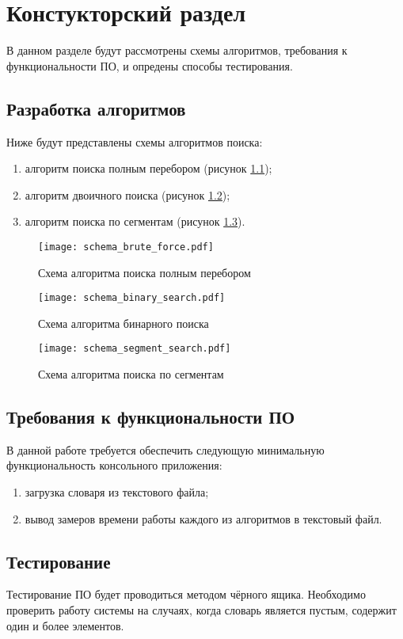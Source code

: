 \chapter{ Констукторский раздел}
\label{cha:design}
    В данном разделе будут рассмотрены схемы алгоритмов, требования к функциональности ПО,
    и опредены способы тестирования.
    
    \section{Разработка алгоритмов}
        Ниже будут представлены схемы алгоритмов поиска: \begin{enumerate}
            \item алгоритм поиска полным перебором (рисунок \ref{schema:search:brute-force});
            \item алгоритм двоичного поиска  (рисунок \ref{schema:search:binary});
            \item алгоритм поиска по сегментам (рисунок \ref{schema:search:segment}).
        \end{enumerate}

    \begin{figure}[h!]
        \centering
            \texttt{[image: schema\_brute\_force.pdf]}
            \caption{Схема алгоритма поиска полным перебором}
            \label{schema:search:brute-force}
    \end{figure}

    \begin{figure}[h!]
        \centering
            \texttt{[image: schema\_binary\_search.pdf]}
            \caption{Схема алгоритма бинарного поиска}
            \label{schema:search:binary}
    \end{figure}

    \begin{figure}[h!]
        \centering
            \texttt{[image: schema\_segment\_search.pdf]}
            \caption{Схема алгоритма поиска по сегментам}
            \label{schema:search:segment}
    \end{figure}

    \section{Требования к функциональности ПО}
        В данной работе требуется обеспечить следующую минимальную функциональность консольного приложения:
        \begin{enumerate}
            \item загрузка словаря из текстового файла;
            \item вывод замеров времени работы каждого из алгоритмов в текстовый файл.
        \end{enumerate}

    \section{Тестирование}
        Тестирование ПО будет проводиться методом чёрного ящика. Необходимо проверить работу системы 
        на случаях, когда словарь является пустым, содержит один и более элементов.

\newpage